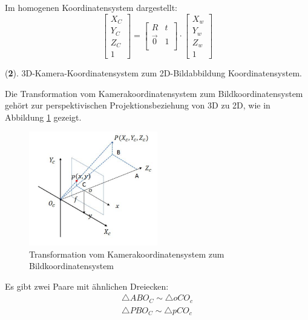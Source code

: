 Im homogenen Koordinatensystem dargestellt:
\begin{equation}
   \begin{bmatrix}
	X_C \\  
	Y_C \\
	Z_C \\
	1
	\end{bmatrix} = \begin{bmatrix}
	R & t	\\
	\vec{0}	& 1 \\
	\end{bmatrix} \cdot \begin{bmatrix}
	X_w \\  
	Y_w \\
	Z_w \\
	1
	\end{bmatrix}
\end{equation}

(\textbf{2}). 3D-Kamera-Koordinatensystem zum 2D-Bildabbildung Koordinatensystem.

Die Transformation vom Kamerakoordinatensystem zum Bildkoordinatensystem gehört zur perspektivischen Projektionsbeziehung von 3D zu 2D, wie in Abbildung \ref{fig:Czuimage} gezeigt.

\begin{figure}[H]
 \centering 
 \includegraphics[keepaspectratio,width=0.5\textwidth]{images/3_Ersteverfahren/Kamera/Czuimage.pdf}
 \caption{Transformation vom Kamerakoordinatensystem zum Bildkoordinatensystem}
 \label{fig:Czuimage}
\end{figure} 

Es gibt zwei Paare mit ähnlichen Dreiecken:
\begin{equation}
   \begin{split}
    \triangle ABO_C \sim \triangle oCO_c\\  
	\triangle PBO_C \sim \triangle pCO_c
	\end{split}
\end{equation}

